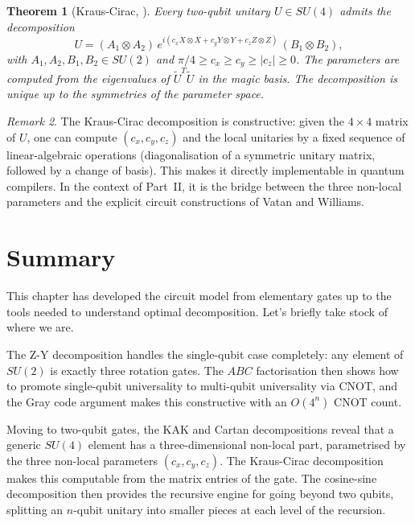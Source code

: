 \documentclass[12pt, a4paper, oneside]{report}
\theoremstyle{plain}
\newtheorem{theorem}{Theorem}[chapter]
\theoremstyle{definition}
\theoremstyle{remark}
\newtheorem{remark}[theorem]{Remark}
\begin{document}
\begin{theorem}[Kraus-Cirac, \cite{kraus2001}]
	\label{thm:kraus-cirac}
	Every two-qubit unitary $U \in SU(4)$ admits the decomposition
	\[
		U = (A_1 \otimes A_2)\,e^{i(c_x X\otimes X + c_y Y\otimes Y + c_z Z\otimes Z)}\,(B_1 \otimes B_2),
	\]
	with $A_1, A_2, B_1, B_2 \in SU(2)$ and $\pi/4 \geq c_x \geq c_y \geq |c_z| \geq 0$. The parameters
	are computed from the eigenvalues of $\tilde{U}^T\tilde{U}$ in the magic basis. The
	decomposition is unique up to the symmetries of the parameter space.
\end{theorem}

\begin{remark}
	The Kraus-Cirac decomposition is constructive: given the $4 \times 4$ matrix of $U$, one
	can compute $(c_x, c_y, c_z)$ and the local unitaries by a fixed sequence of linear-algebraic
	operations (diagonalisation of a symmetric unitary matrix, followed by a change of basis).
	This makes it directly implementable in quantum compilers. In the context of Part~II, it is
	the bridge between the three non-local parameters and the explicit circuit constructions
	of Vatan and Williams.
\end{remark}


\section{Summary}

This chapter has developed the circuit model from elementary gates up to the tools needed to
understand optimal decomposition. Let's briefly take stock of where we are.

The Z-Y decomposition handles the single-qubit case completely: any element of $SU(2)$ is
exactly three rotation gates. The $ABC$ factorisation then shows how to promote single-qubit
universality to multi-qubit universality via CNOT, and the Gray code argument makes this
constructive with an $O(4^n)$ CNOT count.

Moving to two-qubit gates, the KAK and Cartan decompositions reveal that a generic
$SU(4)$ element has a three-dimensional non-local part, parametrised by the three
non-local parameters $(c_x, c_y, c_z)$. The Kraus-Cirac decomposition makes this computable from the
matrix entries of the gate. The cosine-sine decomposition then provides the recursive engine
for going beyond two qubits, splitting an $n$-qubit unitary into smaller pieces at each
level of the recursion.
\end{document}
